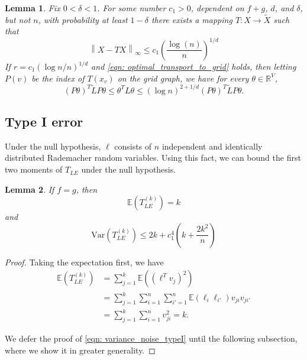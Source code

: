 \documentclass{article}
\newcommand{\Reals}{\mathbb{R}}
\newcommand{\norm}[1]{\left\lVert#1\right\rVert}
\newcommand{\Var}{\mathrm{Var}}
\newcommand{\1}{\mathbb{I}}
\newcommand{\Ebb}{\mathbb{E}}
\newcommand{\wt}[1]{\widetilde{#1}}
\theoremstyle{alden}
\theoremstyle{aldenthm}
\newtheorem{lemma}{Lemma}
\theoremstyle{definition}
\theoremstyle{remark}
\begin{document}
\begin{lemma}
	Fix $0 < \delta < 1$. For some number $c_1 > 0$, dependent on $f + g$, $d$, and $\delta$, but not $n$, with probability at least $1 - \delta$ there exists a mapping $T: X \to \wt{X}$ such that
	\begin{equation}
	\label{eqn: optimal_transport_to_grid}
	\norm{X - TX}_{\infty} \leq c_1 \left(\frac{\log(n)}{n}\right)^{1/d}
	\end{equation}
	If $r = c_1 (\log n / n)^{1/d}$ and \ref{eqn: optimal_transport_to_grid} holds, then letting $P(v)$ be the index of $T(x_v)$ on the grid graph, we have for every $\theta \in \Reals^V$,
	\begin{equation}
	(P\theta)^T \wt{L} P \theta \leq \theta^T L \theta \leq (\log n)^{2 + 1/d} (P\theta)^T \wt{L} P \theta.
	\end{equation}
\end{lemma}

\subsection{Type I error}

Under the null hypothesis, $\ell$ consists of $n$ independent and identically distributed Rademacher random variables. Using this fact, we can bound the first two moments of $T_{LE}$ under the null hypothesis.

\begin{lemma}
	If $f = g$, then
	\begin{equation}
	\Ebb(T_{LE}^{(k)}) = k
	\end{equation}
	and
	\begin{equation}
	\label{eqn: variance_noise_typeI}
	\Var(T_{LE}^{(k)}) \leq 2k + c_1^4\left(k + \frac{2k^2}{n}\right)
	\end{equation}
\end{lemma}
\begin{proof}
	Taking the expectation first, we have
	\begin{align*}
	\Ebb(T_{LE}^{(k)}) & = \sum_{j = 1}^{k} \Ebb((\ell^T v_j)^2) \\
	& = \sum_{j = 1}^{k} \sum_{i = 1}^{n} \sum_{i' = 1}^{n} \Ebb(\ell_i \ell_{i'}) v_{ji} v_{ji'} \\
	& =  \sum_{j = 1}^{k} \sum_{i = 1}^{n} v_{ji}^2 = k.
	\end{align*}
	
	We defer the proof of \eqref{eqn: variance_noise_typeI} until the following subsection, where we show it in greater generality.
\end{proof}
\end{document}
